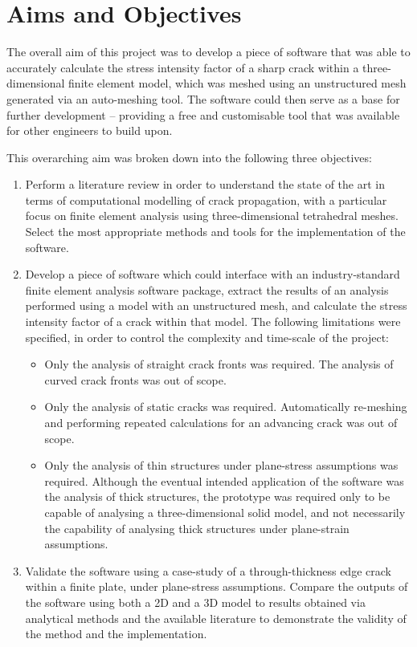 \newpage
\section{Aims and Objectives}\label{sec:aims_objectives}

The overall aim of this project was to develop a piece of software that was able to accurately calculate the stress intensity factor of a sharp crack within a three-dimensional finite element model, which was meshed using an unstructured mesh generated via an auto-meshing tool. The software could then serve as a base for further development -- providing a free and customisable tool that was available for other engineers to build upon.

This overarching aim was broken down into the following three objectives:

\begin{enumerate}
	
    \item Perform a literature review in order to understand the state of the art in terms of computational modelling of crack propagation, with a particular focus on finite element analysis using three-dimensional tetrahedral meshes. Select the most appropriate methods and tools for the implementation of the software.
    
    \item Develop a piece of software which could interface with an industry-standard finite element analysis software package, extract the results of an analysis performed using a model with an unstructured mesh, and calculate the stress intensity factor of a crack within that model. The following limitations were specified, in order to control the complexity and time-scale of the project:
    
    \begin{itemize}
    	\item Only the analysis of straight crack fronts was required. The analysis of curved crack fronts was out of scope.
    	\item Only the analysis of static cracks was required. Automatically re-meshing and performing repeated calculations for an advancing crack was out of scope.
    	\item Only the analysis of thin structures under plane-stress assumptions was required. Although the eventual intended application of the software was the analysis of thick structures, the prototype was required only to be capable of analysing a three-dimensional solid model, and not necessarily the capability of analysing thick structures under plane-strain assumptions.
    \end{itemize}

    \item Validate the software using a case-study of a through-thickness edge crack within a finite plate, under plane-stress assumptions. Compare the outputs of the software using both a 2D and a 3D model to results obtained via analytical methods and the available literature to demonstrate the validity of the method and the implementation.
    
\end{enumerate}

